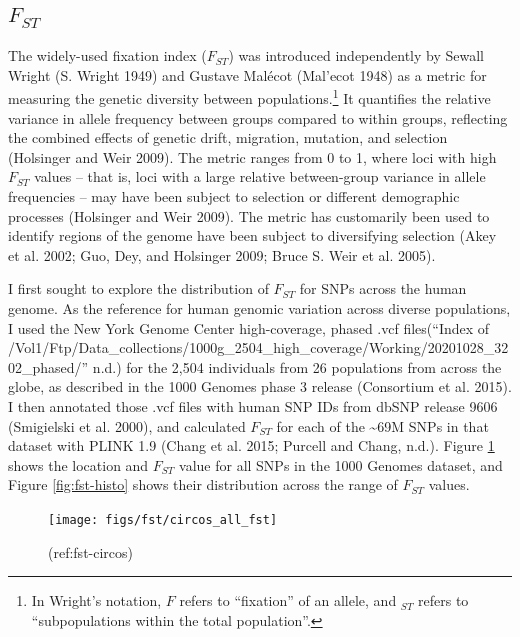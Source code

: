 \documentclass[
]{book}
\begin{document}
\hypertarget{Fst-descr}{%
\subsection{\texorpdfstring{\(F_{ST}\)}{F\_\{ST\}}}\label{Fst-descr}}

The widely-used fixation index (\(F_{ST}\)) was introduced independently by Sewall Wright (S. Wright 1949) and Gustave Malécot (Mal'ecot 1948) as a metric for measuring the genetic diversity between populations.\footnote{In Wright's notation, \(F\) refers to ``fixation'' of an allele, and \(_{ST}\) refers to ``subpopulations within the total population''.} It quantifies the relative variance in allele frequency between groups compared to within groups, reflecting the combined effects of genetic drift, migration, mutation, and selection (Holsinger and Weir 2009). The metric ranges from 0 to 1, where loci with high \(F_{ST}\) values -- that is, loci with a large relative between-group variance in allele frequencies -- may have been subject to selection or different demographic processes (Holsinger and Weir 2009). The metric has customarily been used to identify regions of the genome have been subject to diversifying selection (Akey et al. 2002; Guo, Dey, and Holsinger 2009; Bruce S. Weir et al. 2005).

I first sought to explore the distribution of \(F_{ST}\) for SNPs across the human genome. As the reference for human genomic variation across diverse populations, I used the New York Genome Center high-coverage, phased .vcf files({``Index of /Vol1/Ftp/Data\_collections/{1000g}\_2504\_high\_coverage/Working/20201028\_3202\_phased/''} n.d.) for the 2,504 individuals from 26 populations from across the globe, as described in the 1000 Genomes phase 3 release (Consortium et al. 2015). I then annotated those .vcf files with human SNP IDs from dbSNP release 9606 (Smigielski et al. 2000), and calculated \(F_{ST}\) for each of the \textasciitilde69M SNPs in that dataset with PLINK 1.9 (Chang et al. 2015; Purcell and Chang, n.d.). Figure \ref{fig:fst-circos} shows the location and \(F_{ST}\) value for all SNPs in the 1000 Genomes dataset, and Figure \ref{fig:fst-histo} shows their distribution across the range of \(F_{ST}\) values.

\begin{figure}
\texttt{[image: figs/fst/circos\_all\_fst]} \caption{(ref:fst-circos)}\label{fig:fst-circos}
\end{figure}
\end{document}
